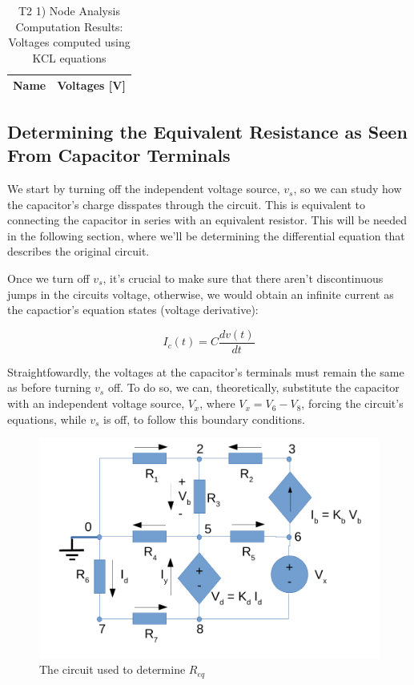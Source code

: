 \begin{table}[ht]
  \centering
  \begin{tabular}{|l|r|}
    \hline    
    {\bf Name} & {\bf Voltages [V]} \\ \hline
    
  \end{tabular}
  \caption{T2 1) Node Analysis Computation Results: Voltages computed using KCL equations}
  \label{tab:nodeVoltages1}
\end{table}


\newpage

\subsection{Determining the Equivalent Resistance as Seen From Capacitor Terminals}

We start by turning off the independent voltage source, $v_s$, so we can study how the capacitor's charge disspates through the circuit. This is equivalent to connecting the capacitor in series with an equivalent resistor. This will be needed in the following section, where we'll be determining the differential equation that describes the original circuit.

Once we turn off $v_s$, it's crucial to make sure that there aren't discontinuous jumps in the circuits voltage, otherwise, we would obtain an infinite current as the capactior's equation states (voltage derivative):

\begin{center}
  \begin{equation}
    I_c(t) =  C \frac{dv(t)}{dt}
  \end{equation} 
\end{center}

Straightfowardly, the voltages at the capacitor's terminals must remain the same as before turning $v_s$ off. To do so, we can, theoretically, substitute the capacitor with an independent voltage source, $V_x$, where $V_x = V_6- V_8$, forcing the circuit's equations, while $v_s$ is off, to follow this boundary conditions.


\begin{figure}[h] \centering
\includegraphics[width=0.5\linewidth]{t2-t2.pdf}
\caption{The circuit used to determine $R_{eq}$}
\label{fig3}
\end{figure}

